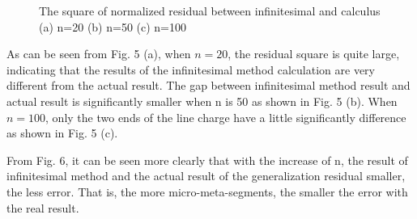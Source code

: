 \documentclass[journal,twocolumn,letterpaper]{IEEEJERM}
\begin{document}
\begin{figure}[H]   
	\centering	  
	    \label{61}\hfill	  
	\label{62}\hfill
	    \label{63}\hfill	  
	\caption{The square of normalized residual between infinitesimal and calculus (a) n=20 (b) n=50 (c) n=100
	}	  
	\label{fig5} 
\end{figure}

As can be seen from Fig. 5 (a), when $n=20$, the residual square is quite large, indicating that the results of the infinitesimal method calculation are very different from the actual result. The gap between infinitesimal method result and actual result is significantly smaller when n is 50 as shown in Fig. 5 (b). When $n=100$, only the two ends of the line charge have a little significantly difference as shown in Fig. 5 (c).

From Fig. 6, it can be seen more clearly that with the increase of n, the result of infinitesimal method and the actual result of the generalization residual smaller, the less error. That is, the more micro-meta-segments, the smaller the error with the real result. 
\end{document}
